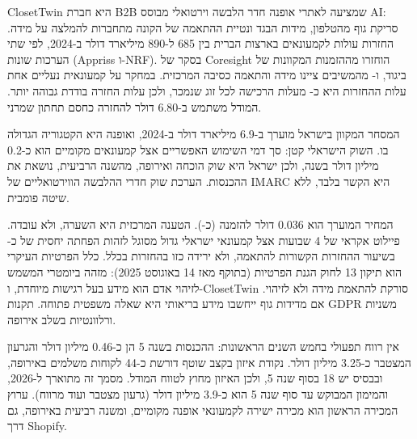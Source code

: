 \begin{hebrewpage}


ClosetTwin היא חברת B2B שמציעה לאתרי אופנה חדר הלבשה וירטואלי מבוסס AI: סריקת גוף מהטלפון, מידות הבגד ונטיית ההתאמה של הקונה מתחברות להמלצה על מידה. החזרות עולות לקמעונאים בארצות הברית בין 685 ל-890 מיליארד דולר ב-2024, לפי שתי הערכות שונות (Appriss ו-NRF). בסקר של Coresight הוחזרו  מההזמנות המקוונות של ביגוד, ו- מהמשיבים ציינו מידה והתאמה כסיבה המרכזית. במחקר על קמעונאית נעליים אחת עלות ההחזרות היא כ- מעלות הרכישה לכל זוג שנמכר, ולכן עלות החזרה בודדת גבוהה יותר. המודל משתמש ב-6.80 דולר להחזרה כחסם תחתון שמרני.

המסחר המקוון בישראל מוערך ב-6.9 מיליארד דולר ב-2024, ואופנה היא הקטגוריה הגדולה בו. השוק הישראלי קטן: סך דמי השימוש האפשריים אצל קמעונאים מקומיים הוא כ-0.2 מיליון דולר בשנה, ולכן ישראל היא שוק הוכחה ואירופה, מהשנה הרביעית, נושאת את ההכנסות. הערכת שוק חדרי ההלבשה הווירטואליים של IMARC היא הקשר בלבד, ללא שיטה פומבית.

המחיר המוערך הוא 0.036 דולר להזמנה (כ-). הטענה המרכזית היא השערה, ולא עובדה. פיילוט אקראי של 4 שבועות אצל קמעונאי ישראלי גדול מסוגל לזהות הפחתה יחסית של כ- בשיעור ההחזרות הקשורות להתאמה, ולא ירידה כזו בהחזרות בכלל. כלל הפרטיות העיקרי הוא תיקון 13 לחוק הגנת הפרטיות (בתוקף מאז 14 באוגוסט 2025): מזהה ביומטרי המשמש לזיהוי אדם הוא מידע בעל רגישות מיוחדת, ו-ClosetTwin סורקת להתאמת מידה ולא לזיהוי. אם מדידות גוף ייחשבו מידע בריאותי היא שאלה משפטית פתוחה. תקנות GDPR משניות ורלוונטיות בשלב אירופה.

אין רווח תפעולי בחמש השנים הראשונות: ההכנסות בשנה 5 הן כ-0.46 מיליון דולר והגרעון המצטבר כ-3.25 מיליון דולר. נקודת איזון בקצב שוטף דורשת כ-44 לקוחות משלמים באירופה, ובבסיס יש 18 בסוף שנה 5, ולכן האיזון מחוץ לטווח המודל. מסמך זה מתוארך ל-2026, והמימון המבוקש עד סוף שנה 5 הוא כ-3.9 מיליון דולר (גרעון מצטבר ועוד  מרווח). ערוץ המכירה הראשון הוא מכירה ישירה לקמעונאי אופנה מקומיים, ומשנה רביעית באירופה, גם דרך Shopify.
\end{hebrewpage}
